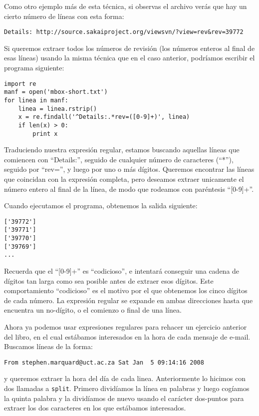 Como otro ejemplo más de esta técnica, si observas el archivo verás que hay un cierto número de líneas
con esta forma:

\beforeverb
\begin{verbatim}
Details: http://source.sakaiproject.org/viewsvn/?view=rev&rev=39772
\end{verbatim}
\afterverb
%
Si queremos extraer todos los números de revisión (los números enteros al final de esas líneas)
usando la misma técnica que en el caso anterior, podríamos escribir el programa siguiente:

\beforeverb
\begin{verbatim}
import re
manf = open('mbox-short.txt')
for linea in manf:
    linea = linea.rstrip()
    x = re.findall('^Details:.*rev=([0-9]+)', linea)
    if len(x) > 0:
        print x
\end{verbatim}
\afterverb
%
Traduciendo nuestra expresión regular, estamos buscando aquellas líneas que comiencen con ``Details:'',
seguido de cualquier número de caracteres (``*''), seguido por ``rev='', y luego por uno o más dígitos.
Queremos encontrar las líneas que coincidan con la expresión completa, pero deseamos extraer unicamente
el número entero al final de la línea, de modo que rodeamos con paréntesis ``[0-9]+''.

Cuando ejecutamos el programa, obtenemos la salida siguiente:

\beforeverb
\begin{verbatim}
['39772']
['39771']
['39770']
['39769']
...
\end{verbatim}
\afterverb
%
Recuerda que el ``[0-9]+'' es ``codicioso'', e intentará conseguir una cadena de dígitos tan larga
como sea posible antes de extraer esos dígitos. Este comportamiento ``codicioso'' es el motivo por el que obtenemos
los cinco dígitos de cada número. La expresión regular se expande en ambas direcciones hasta que
encuentra un no-dígito, o el comienzo o final de una línea.

Ahora ya podemos usar expresiones regulares para rehacer un ejercicio anterior del libro, en el cual estábamos
interesados en la hora de cada mensaje de e-mail. Buscamos líneas de la forma:

\beforeverb
\begin{verbatim}
From stephen.marquard@uct.ac.za Sat Jan  5 09:14:16 2008
\end{verbatim}
\afterverb
%
y queremos extraer la hora del día de cada linea. Anteriormente lo hicimos con dos llamadas a
{\tt split}. Primero dividíamos la línea en palabras y luego cogíamos la quinta palabra y la dividíamos
de nuevo usando el carácter dos-puntos para extraer los dos caracteres en los que estábamos interesados.

